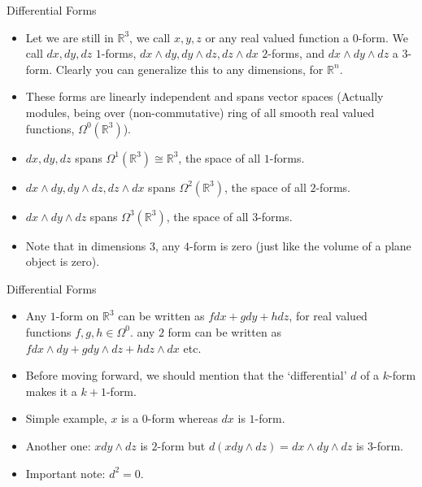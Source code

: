 \documentclass{beamer}
\theoremstyle{definition}
\begin{document}
	\begin{frame}{Differential Forms}{}
		\begin{itemize}
            \item<1-> {Let we are still in $\mathbb{R}^3$, we call $x, y, z$ or any real valued function a $0$-form. We call $dx, dy, dz$ $1$-forms, $dx \wedge dy, dy \wedge dz, dz \wedge dx$ $2$-forms, and $dx \wedge dy \wedge dz$ a $3$-form. Clearly you can generalize this to any dimensions, for $\mathbb{R}^n$.}
            \item<2-> {These forms are linearly independent and spans vector spaces (Actually modules, being over (non-commutative) ring of all smooth real valued functions, $\Omega^0(\mathbb{R}^3)$).}
            \item<3-> {$dx, dy, dz$ spans $\Omega^1(\mathbb{R}^3) \cong \mathbb{R}^3$, the space of all $1$-forms.}
            \item<4-> {$dx \wedge dy, dy \wedge dz, dz \wedge dx$ spans $\Omega^2(\mathbb{R}^3)$, the space of all $2$-forms.}
            \item<5-> {$dx \wedge dy \wedge dz$ spans $\Omega^3(\mathbb{R}^3)$, the space of all $3$-forms.}
            \item<6-> {Note that in dimensions $3$, any $4$-form is zero (just like the volume of a plane object is zero).}
        \end{itemize}
	\end{frame}
	\begin{frame}{Differential Forms}{}
		\begin{itemize}
            \item<1-> {Any $1$-form on $\mathbb{R}^3$ can be written as $fdx + gdy + hdz$, for real valued functions $f, g, h \in \Omega^0$. any $2$ form can be written as $fdx \wedge dy + g dy \wedge dz + h dz \wedge dx$ etc.}
            \item<2-> {Before moving forward, we should mention that the `differential' $d$ of a $k$-form makes it a $k+1$-form.}
            \item<3-> {Simple example, $x$ is a $0$-form whereas $dx$ is $1$-form. }
            \item<4-> {Another one: $xdy\wedge dz$ is $2$-form but $d(xdy\wedge dz) = dx \wedge dy \wedge dz$ is $3$-form.}
            \item<5-> {Important note: $d^2 = 0$.}
        \end{itemize}
	\end{frame}
\end{document}
